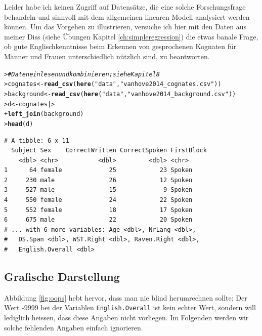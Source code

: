 \documentclass[oneside, 10pt]{book}\usepackage[]{graphicx}\usepackage[]{xcolor}
\makeatletter
\newcommand{\hlstr}[1]{\textcolor[rgb]{0.192,0.494,0.8}{#1}}%
\newcommand{\hlcom}[1]{\textcolor[rgb]{0.678,0.584,0.686}{\textit{#1}}}%
\newcommand{\hlstd}[1]{\textcolor[rgb]{0.345,0.345,0.345}{#1}}%
\newcommand{\hlkwb}[1]{\textcolor[rgb]{0.69,0.353,0.396}{#1}}%
\newcommand{\hlkwd}[1]{\textcolor[rgb]{0.737,0.353,0.396}{\textbf{#1}}}%
\newenvironment{kframe}{%
 \def\at@end@of@kframe{}%
 \ifinner\ifhmode%
  \def\at@end@of@kframe{\end{minipage}}%
  \begin{minipage}{\columnwidth}%
 \fi\fi%
 \def\FrameCommand##1{\hskip\@totalleftmargin \hskip-\fboxsep
 \colorbox{shadecolor}{##1}\hskip-\fboxsep
     \hskip-\linewidth \hskip-\@totalleftmargin \hskip\columnwidth}%
 \MakeFramed {\advance\hsize-\width
   \@totalleftmargin\z@ \linewidth\hsize
   \@setminipage}}%
 {\par\unskip\endMakeFramed%
 \at@end@of@kframe}
\newenvironment{knitrout}{}{} %
\makeatother
\begin{document}
\medskip

Leider habe ich keinen Zugriff auf Datensätze, die eine solche Forschungsfrage
behandeln und sinnvoll mit dem allgemeinen linearen Modell analysiert werden
können. Um das Vorgehen zu illustrieren, versuche ich hier mit den Daten aus meiner
Diss (siehe Übungen Kapitel \ref{ch:simpleregression}) die etwas banale Frage,
ob gute Englischkenntnisse beim Erkennen von gesprochenen Kognaten
für Männer und Frauen unterschiedlich nützlich sind, zu beantworten.

\begin{knitrout}
\color{fgcolor}\begin{kframe}
\begin{alltt}
\hlstd{> }\hlcom{# Daten einlesen und kombinieren; siehe Kapitel 8}
\hlstd{> }\hlstd{cognates} \hlkwb{<-} \hlkwd{read_csv}\hlstd{(}\hlkwd{here}\hlstd{(}\hlstr{"data"}\hlstd{,} \hlstr{"vanhove2014_cognates.csv"}\hlstd{))}
\hlstd{> }\hlstd{background} \hlkwb{<-} \hlkwd{read_csv}\hlstd{(}\hlkwd{here}\hlstd{(}\hlstr{"data"}\hlstd{,} \hlstr{"vanhove2014_background.csv"}\hlstd{))}
\hlstd{> }\hlstd{d} \hlkwb{<-} \hlstd{cognates |>}
\hlstd{+ }  \hlkwd{left_join}\hlstd{(background)}
\hlstd{> }\hlkwd{head}\hlstd{(d)}
\end{alltt}
\begin{verbatim}
# A tibble: 6 x 11
  Subject Sex    CorrectWritten CorrectSpoken FirstBlock
    <dbl> <chr>           <dbl>         <dbl> <chr>     
1      64 female             25            23 Spoken    
2     230 male               26            12 Spoken    
3     527 male               15             9 Spoken    
4     550 female             24            22 Spoken    
5     552 female             18            17 Spoken    
6     675 male               22            20 Spoken    
# ... with 6 more variables: Age <dbl>, NrLang <dbl>,
#   DS.Span <dbl>, WST.Right <dbl>, Raven.Right <dbl>,
#   English.Overall <dbl>
\end{verbatim}
\end{kframe}
\end{knitrout}

\subsection{Grafische Darstellung}
Abbildung \ref{fig:oops} hebt hervor, dass man nie blind herumrechnen sollte:
Der Wert -9999 bei der Variablen \texttt{English.Overall} ist kein echter Wert,
sondern will lediglich heissen, dass diese Angaben nicht vorliegen.
Im Folgenden werden wir solche fehlenden Angaben einfach ignorieren.
\end{document}
